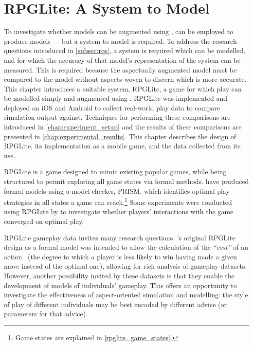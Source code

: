 \chapter{RPGLite: A System to Model}\label{chap:rpglite}


To investigate whether models can be augmented using \aop{}, \pdsf{} can be
employed to produce \aspectoriented{} models --- but a system to model is
required. To address the research questions introduced in \cref{subsec:rqs}, a
system is required which can be modelled, and for which the accuracy of that
model's representation of the system can be measured. This is required because
the aspectually augmented model must be compared to the model without aspects
woven to discern which is more accurate. This chapter introduces a suitable
system, RPGLite, a game for which play can be modelled simply and augmented
using \aop{}. RPGLite was implemented and deployed on iOS and Android to collect
real-world play data to compare simulation output against. Techniques for
performing these comparisons are introduced in \cref{chap:experiment_setup} and
the results of these comparisons are presented in
\cref{chap:experimental_results}. This chapter describes the design of RPGLite,
its implementation as a mobile game, and the data collected from its use.

RPGLite is a game designed to mimic existing popular games, while being
structured to permit exploring all game states via formal methods.
\citet{kavanagh2020} have produced formal models using a model-checker, PRISM,
which identifies optimal play strategies in all states a game can
reach.\footnote{Game states are explained in \cref{rpglite_game_states}.} Some
experiments were conducted using RPGLite by \citet{kavanagh2021thesis} to
investigate whether players' interactions with the game converged on optimal
play.

RPGLite gameplay data invites many research questions.
\citeauthor{kavanagh2020}'s original RPGLite design as a formal model was
intended to allow the calculation of the \emph{``cost''} of an
action~\cite{kavanagh2020,kavanagh2021thesis} (the degree to which a player is
less likely to win having made a given move instead of the optimal one),
allowing for rich analysis of gameplay datasets. However, another possibility
invited by these datasets is that they enable the development of models of
individuals' gameplay. This offers an opportunity to investigate the
effectiveness of aspect-oriented simulation and modelling: the style of play of
different individuals may be best encoded by different advice (or parameters for
that advice).


